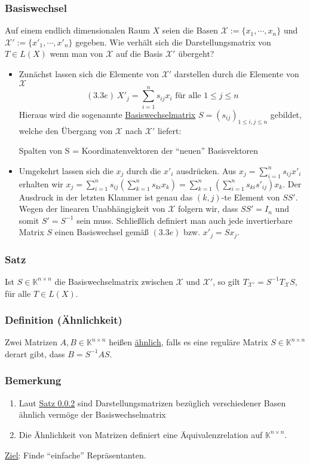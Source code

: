 \subsubsection{Basiswechsel}
\label{basiswechsel}
Auf einem endlich dimensionalen Raum $X$ seien die Basen $\mathcal{X}:=\{x_1,\cdots ,x_n\}$ und $\mathcal{X}':=\{x'_1,\cdots ,x'_n\}$ gegeben.  Wie verhält sich die Darstellungsmatrix von $T\in L(X)$ wenn man von $\mathcal{X}$ auf die Basis $\mathcal{X}'$ übergeht?
\begin{itemize}
\item Zunächst lassen sich die Elemente von $\mathcal{X}'$ darstellen durch die Elemente von $\mathcal{X}$
\[(3.3e)\ X'_j=\sum _{i=1}^ns_{ij}x_i\text{ für alle } 1\leq j\leq n\]
Hieraus wird die sogenannte \underline{Basiswechselmatrix} $S=(s_{ij})_{1\leq i,j\leq n}$ gebildet, welche den Übergang von $\mathcal{X}$ nach $\mathcal{X}'$ liefert:
\begin{center}
Spalten von S = Koordinatenvektoren der "`neuen"' Basisvektoren
\end{center}
\item Umgekehrt lassen sich die $x_j$ durch die $x'_i$ ausdrücken.  Aus $x_j=\sum _{i=1}^ns_{ij}x'_i$ erhalten wir $x_j=\sum _{i=1}^ns_{ij}(\sum _{k=1}^n s_{ki}x_k)=\sum _{k=1}^n(\sum _{i=1}^n s_{ki}s'_{ij})x_k$. Der Ausdruck in der letzten Klammer ist genau das $(k,j)$-te Element von $SS'$.  Wegen der linearen Unabhängigkeit von $\mathcal{X}$ folgern wir, dass $SS'=I_n$ und somit $S'=S^{-1}$ sein muss.  Schließlich definiert man auch jede invertierbare Matrix $S$ einen Basiswechsel gemäß $(3.3e)$ bzw. $x'_j=Sx_j$.
\end{itemize}
\addtocounter{subsubsection}{12}
\subsubsection{Satz}
\label{3.3.16}
Ist $S\in \mathbb{K}^{n\times n}$ die Basiswechselmatrix zwischen $\mathcal{X}$ und $\mathcal{X}'$, so gilt $T_{\mathcal{X}'}=S^{-1}T_\mathcal{X}S$, für alle $T\in L(X)$.
\subsubsection{Definition (Ähnlichkeit)}
Zwei Matrizen $A,B\in \mathbb{K}^{n\times n}$ heißen \underline{ähnlich}, falls es eine reguläre Matrix $S\in\mathbb{K}^{n\times n}$ derart gibt, dass $B=S^{-1}AS$.
\subsubsection{Bemerkung}
\begin{enumerate}
\renewcommand{\labelenumi}{(\arabic{enumi})}
\item Laut \hyperref[3.3.16]{Satz \ref*{3.3.16}} sind Darstellungsmatrizen bezüglich verschiedener Basen ähnlich vermöge der Basiswechselmatrix
\item Die Ähnlichkeit von Matrizen definiert eine Äquivalenzrelation auf $\mathbb{K}^{n\times n}$.
\end{enumerate}
\underline{Ziel}: Finde "`einfache"' Repräsentanten.